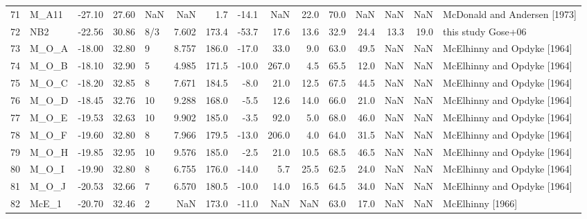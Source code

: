 \documentclass{article}
\begin{document}
{\begin{tabular}{llrrlrrrrrrrrrl}
71 &             M\_A11 &        -27.10 &          27.60 &    NaN &     NaN &    1.7 & -14.1 &    NaN &  22.0 &  70.0 &    NaN &   NaN &   NaN &   McDonald and Andersen [1973] \\
72 &               NB2 &        -22.56 &          30.86 &    8/3 &   7.602 &  173.4 & -53.7 &   17.6 &  13.6 &  32.9 &   24.4 &  13.3 &  19.0 &             this study Gose+06 \\
73 &             M\_O\_A &        -18.00 &          32.80 &      9 &   8.757 &  186.0 & -17.0 &   33.0 &   9.0 &  63.0 &   49.5 &   NaN &   NaN &    McElhinny and Opdyke [1964] \\
74 &             M\_O\_B &        -18.10 &          32.90 &      5 &   4.985 &  171.5 & -10.0 &  267.0 &   4.5 &  65.5 &   12.0 &   NaN &   NaN &    McElhinny and Opdyke [1964] \\
75 &             M\_O\_C &        -18.20 &          32.85 &      8 &   7.671 &  184.5 &  -8.0 &   21.0 &  12.5 &  67.5 &   44.5 &   NaN &   NaN &    McElhinny and Opdyke [1964] \\
76 &             M\_O\_D &        -18.45 &          32.76 &     10 &   9.288 &  168.0 &  -5.5 &   12.6 &  14.0 &  66.0 &   21.0 &   NaN &   NaN &    McElhinny and Opdyke [1964] \\
77 &             M\_O\_E &        -19.53 &          32.63 &     10 &   9.902 &  185.0 &  -3.5 &   92.0 &   5.0 &  68.0 &   46.0 &   NaN &   NaN &    McElhinny and Opdyke [1964] \\
78 &             M\_O\_F &        -19.60 &          32.80 &      8 &   7.966 &  179.5 & -13.0 &  206.0 &   4.0 &  64.0 &   31.5 &   NaN &   NaN &    McElhinny and Opdyke [1964] \\
79 &             M\_O\_H &        -19.85 &          32.95 &     10 &   9.576 &  185.0 &  -2.5 &   21.0 &  10.5 &  68.5 &   46.5 &   NaN &   NaN &    McElhinny and Opdyke [1964] \\
80 &             M\_O\_I &        -19.90 &          32.80 &      8 &   6.755 &  176.0 & -14.0 &    5.7 &  25.5 &  62.5 &   24.0 &   NaN &   NaN &    McElhinny and Opdyke [1964] \\
81 &             M\_O\_J &        -20.53 &          32.66 &      7 &   6.570 &  180.5 & -10.0 &   14.0 &  16.5 &  64.5 &   34.0 &   NaN &   NaN &    McElhinny and Opdyke [1964] \\
82 &             McE\_1 &        -20.70 &          32.46 &      2 &     NaN &  173.0 & -11.0 &    NaN &   NaN &  63.0 &   17.0 &   NaN &   NaN &               McElhinny [1966] \\

\end{tabular}}
\end{document}
